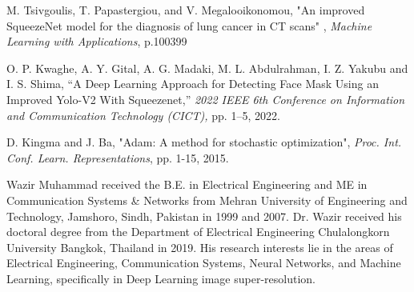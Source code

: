 \documentclass{ieeeaccess}
\begin{document}
\begin{thebibliography}{00}
 M. Tsivgoulis, T. Papastergiou, and V. Megalooikonomou, "An improved SqueezeNet model for the diagnosis of lung cancer in CT scans" , \textit{Machine Learning with Applications}, p.100399

 O. P. Kwaghe, A. Y. Gital, A. G. Madaki, M. L. Abdulrahman, I. Z. Yakubu and I. S. Shima, “A Deep Learning Approach for Detecting Face Mask Using an Improved Yolo-V2 With Squeezenet,” \textit{2022 IEEE 6th Conference on Information and Communication Technology (CICT),} pp. 1–5, 2022. 

 D. Kingma and J. Ba, "Adam: A method for stochastic optimization", \textit {Proc. Int. Conf. Learn. Representations}, pp. 1-15, 2015.

\end{thebibliography}

\begin{IEEEbiography}{Wazir Muhammad} received the B.E. in Electrical
Engineering and ME in Communication Systems \& Networks from Mehran University of Engineering and Technology, Jamshoro, Sindh, Pakistan in 1999 and 2007. Dr. Wazir received his doctoral degree from the Department of Electrical Engineering Chulalongkorn University Bangkok, Thailand in 2019. His research interests lie in the areas of Electrical Engineering, Communication Systems, Neural Networks, and Machine Learning, specifically in Deep Learning image super-resolution.

\end{IEEEbiography}
\end{document}
